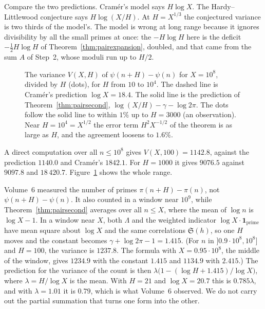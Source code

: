 Compare the two predictions. Cram\'er's model says $H\log X$. The Hardy--Littlewood conjecture says $H\log(X/H)$. At $H=X^{1/3}$ the conjectured variance is two thirds of the model's. The model is wrong at long range because it ignores divisibility by all the small primes at once: the $-H\log H$ here is the deficit $-\frac12H\log H$ of Theorem~\ref{thm:pairexpansion}, doubled, and that came from the sum $A$ of Step~2, whose moduli run up to $H/2$.

\begin{figure}[ht]
\centering{}
\caption{The variance $V(X,H)$ of $\psi(n+H)-\psi(n)$ for $X=10^8$, divided by $H$ (dots), for $H$ from $10$ to $10^4$. The dashed line is Cram\'er's prediction $\log X=18.4$. The solid line is the prediction of Theorem~\ref{thm:pairsecond}, $\log(X/H)-\gamma-\log2\pi$. The dots follow the solid line to within $1\%$ up to $H=3000$ (an observation). Near $H=10^4=X^{1/2}$ the error term $H^2X^{-1/2}$ of the theorem is as large as $H$, and the agreement loosens to $1.6\%$.}
\label{fig:shortvariance}
\end{figure}

\begin{examplex}[$X=10^8$]
A direct computation over all $n\le10^8$ gives $V(X,100)=1142.8$, against the prediction $1140.0$ and Cram\'er's $1842.1$. For $H=1000$ it gives $9076.5$ against $9097.8$ and $18\,420.7$. Figure~\ref{fig:shortvariance} shows the whole range.
\end{examplex}

\begin{remark}
Volume~6 measured the number of primes $\pi(n+H)-\pi(n)$, not $\psi(n+H)-\psi(n)$. It also counted in a window near $10^9$, while Theorem~\ref{thm:pairsecond} averages over all $n\le X$, where the mean of $\log n$ is $\log X-1$. In a window near $X$, both $\Lambda$ and the weighted indicator $\log X\cdot\mathbf 1_{\text{prime}}$ have mean square about $\log X$ and the same correlations $\mathfrak S(h)$, so one $H$ moves and the constant becomes $\gamma+\log2\pi-1=1.415$. (For $n$ in $]0.9\cdot10^8,10^8]$ and $H=100$, the variance is $1237.8$. The formula with $X=0.95\cdot10^8$, the middle of the window, gives $1234.9$ with the constant $1.415$ and $1134.9$ with $2.415$.) The prediction for the variance of the count is then $\lambda\bigl(1-(\log H+1.415)/\log X\bigr)$, where $\lambda=H/\log X$ is the mean. With $H=21$ and $\log X=20.7$ this is $0.785\lambda$, and with $\lambda=1.01$ it is $0.79$, which is what Volume~6 observed. We do not carry out the partial summation that turns one form into the other.
\end{remark}


